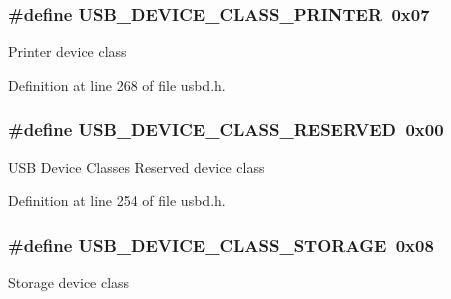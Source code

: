 \subsubsection[{\texorpdfstring{U\+S\+B\+\_\+\+D\+E\+V\+I\+C\+E\+\_\+\+C\+L\+A\+S\+S\+\_\+\+P\+R\+I\+N\+T\+ER}{USB_DEVICE_CLASS_PRINTER}}]{\setlength{\rightskip}{0pt plus 5cm}\#define U\+S\+B\+\_\+\+D\+E\+V\+I\+C\+E\+\_\+\+C\+L\+A\+S\+S\+\_\+\+P\+R\+I\+N\+T\+ER~0x07}\hypertarget{group__USBD__Core_gae6181c6bdb18c0e6491dd189983b6bd2}{}\label{group__USBD__Core_gae6181c6bdb18c0e6491dd189983b6bd2}
Printer device class 

Definition at line 268 of file usbd.\+h.

\subsubsection[{\texorpdfstring{U\+S\+B\+\_\+\+D\+E\+V\+I\+C\+E\+\_\+\+C\+L\+A\+S\+S\+\_\+\+R\+E\+S\+E\+R\+V\+ED}{USB_DEVICE_CLASS_RESERVED}}]{\setlength{\rightskip}{0pt plus 5cm}\#define U\+S\+B\+\_\+\+D\+E\+V\+I\+C\+E\+\_\+\+C\+L\+A\+S\+S\+\_\+\+R\+E\+S\+E\+R\+V\+ED~0x00}\hypertarget{group__USBD__Core_gaca7ece737f3f37b7a6f458fc24864776}{}\label{group__USBD__Core_gaca7ece737f3f37b7a6f458fc24864776}
U\+SB Device Classes Reserved device class 

Definition at line 254 of file usbd.\+h.

\subsubsection[{\texorpdfstring{U\+S\+B\+\_\+\+D\+E\+V\+I\+C\+E\+\_\+\+C\+L\+A\+S\+S\+\_\+\+S\+T\+O\+R\+A\+GE}{USB_DEVICE_CLASS_STORAGE}}]{\setlength{\rightskip}{0pt plus 5cm}\#define U\+S\+B\+\_\+\+D\+E\+V\+I\+C\+E\+\_\+\+C\+L\+A\+S\+S\+\_\+\+S\+T\+O\+R\+A\+GE~0x08}\hypertarget{group__USBD__Core_ga053d2a9c3c9856ee01589ebb64d2e09b}{}\label{group__USBD__Core_ga053d2a9c3c9856ee01589ebb64d2e09b}
Storage device class 

